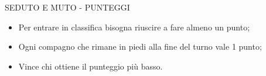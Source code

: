 \documentclass[aspectratio=1610]{beamer}
\begin{document}
\begin{frame}{SEDUTO E MUTO - PUNTEGGI}
    \begin{itemize}
        \item Per entrare in classifica bisogna riuscire a fare almeno un punto;
        \item Ogni compagno che rimane in piedi alla fine del turno vale 1 punto;
        \item Vince chi ottiene il punteggio più basso.
    \end{itemize}
\end{frame}
\end{document}
